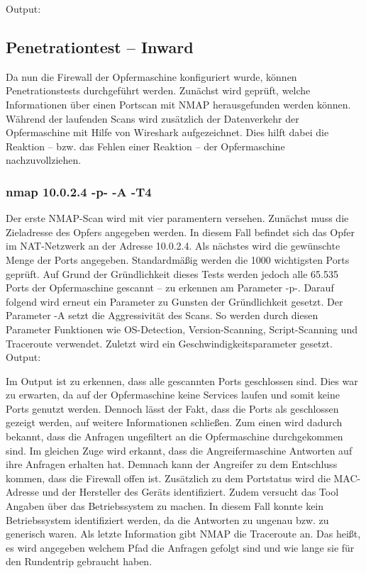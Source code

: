 \newpage



\newpage
Output: 


\subsection{Penetrationtest – Inward}
Da nun die Firewall der Opfermaschine konfiguriert wurde, können Penetrationstests durchgeführt werden. 
Zunächst wird geprüft, welche Informationen über einen Portscan mit NMAP herausgefunden werden können. 
Während der laufenden Scans wird zusätzlich der Datenverkehr der Opfermaschine mit Hilfe von Wireshark aufgezeichnet. 
Dies hilft dabei die Reaktion – bzw. das Fehlen einer Reaktion – der Opfermaschine nachzuvollziehen.
\subsubsection{nmap 10.0.2.4 -p- -A -T4}
Der erste NMAP-Scan wird mit vier paramentern versehen. Zunächst muss die Zieladresse des Opfers angegeben werden. In diesem Fall befindet sich das Opfer im NAT-Netzwerk an der Adresse 10.0.2.4. Als nächstes wird die gewünschte Menge der Ports angegeben. Standardmäßig werden die 1000 wichtigsten Ports geprüft. Auf Grund der Gründlichkeit dieses Tests werden jedoch alle 65.535 Ports der Opfermaschine gescannt – zu erkennen am Parameter -p-. Darauf folgend wird erneut ein Parameter zu Gunsten der Gründlichkeit gesetzt. Der Parameter -A setzt die Aggressivität des Scans. So werden durch diesen Parameter Funktionen wie OS-Detection, Version-Scanning, Script-Scanning und Traceroute verwendet. Zuletzt wird ein Geschwindigkeitsparameter gesetzt. \\

Output:


Im Output ist zu erkennen, dass alle gescannten Ports geschlossen sind. Dies war zu erwarten, da auf der Opfermaschine keine Services laufen und somit keine Ports genutzt werden. Dennoch lässt der Fakt, dass die Ports als geschlossen gezeigt werden, auf weitere Informationen schließen. Zum einen wird dadurch bekannt, dass die Anfragen ungefiltert an die Opfermaschine durchgekommen sind. Im gleichen Zuge wird erkannt, dass die Angreifermaschine Antworten auf ihre Anfragen erhalten hat. Demnach kann der Angreifer zu dem Entschluss kommen, dass die Firewall offen ist. 
Zusätzlich zu dem Portstatus wird die MAC-Adresse und der Hersteller des Geräts identifiziert. Zudem versucht das Tool Angaben über das Betriebssystem zu machen. In diesem Fall konnte kein Betriebssystem identifiziert werden, da die Antworten zu ungenau bzw. zu generisch waren. Als letzte Information gibt NMAP die Traceroute an. Das heißt, es wird angegeben welchem Pfad die Anfragen gefolgt sind und wie lange sie für den Rundentrip gebraucht haben.

